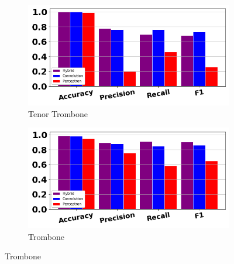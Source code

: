\documentclass[12pt,letterpaper]{article}
\begin{document}
\begin{figure}[H]
	\begin{subfigure}[b]{0.45\textwidth}
	\centering
	\includegraphics[width=\textwidth]{../FiguresClasses/TenorTrombone}
	\caption{Tenor Trombone}
	\end{subfigure}	
	\hfill
	\begin{subfigure}[b]{0.45\textwidth}
	\centering
	\includegraphics[width=\textwidth]{../FiguresClasses/Trombone}
	\caption{Trombone}
	\end{subfigure}	
	

\end{figure}
\end{document}
